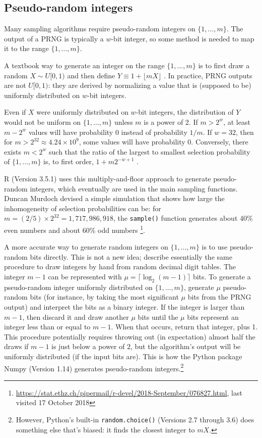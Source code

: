 \documentclass[graybox]{svmult}
\begin{document}
\subsection{Pseudo-random integers}
\label{sec:integers}
Many sampling algorithms require pseudo-random integers on $\{1, \ldots, m\}$.
The output of a PRNG is typically a $w$-bit integer, so some method is needed to map it to the range $\{1, \ldots, m\}$.

A textbook way to generate an integer on the range $\{1, \ldots, m\}$ is to first draw a random $X \sim U[0,1)$
and then define $Y \equiv 1 + \lfloor mX \rfloor$ \cite{press_numerical_1988, peck_introduction_2011}. 
In practice, PRNG outputs are not $U[0,1)$: they are derived by normalizing a value that is
 (supposed to be) uniformly distributed on $w$-bit integers. 

Even if $X$ were uniformly distributed on $w$-bit integers, the distribution of $Y$ would not be uniform on $\{1, \ldots, m\}$ unless $m$ is a power of 2.
If $m > 2^w$, at least $m-2^w$ values will have probability 0 instead of probability $1/m$.
If $w=32$, then for $m>2^{32}\approx4.24 \times 10^9$, some values will have probability 0. 
Conversely, there exists $m < 2^w$ such that the ratio of the largest to smallest selection probability
of $\{1, \ldots, m\}$ is, to first order,  $1+ m 2^{-w+1}$ \cite{knuth_art_1997}.

R (Version 3.5.1) \cite{R_2018} uses this multiply-and-floor approach to generate 
pseudo-random integers,
which eventually are used in the main sampling functions.
Duncan Murdoch devised a simple simulation that shows how large the inhomogeneity of selection
probabilities can be:
for $m=  (2/5) \times 2^{32} = 1,717,986,918$, the \texttt{sample()} function generates about 40\% even numbers and about 60\% odd numbers \footnote{ %
\url{https://stat.ethz.ch/pipermail/r-devel/2018-September/076827.html}, last visited 17 October 2018
}. %
    
A more accurate way to generate random integers on $\{1, \dots, m\}$ is to use pseudo-random bits directly. 
This is not a new idea; \cite{hodges_basic_1970} describe essentially the same procedure to draw integers by hand
from random decimal digit tables.
The integer $m-1$ can be represented with $\mu = \lceil \log_2(m-1) \rceil$ bits. 
To generate a pseudo-random integer uniformly distributed on $\{1, \ldots, m\}$, 
generate $\mu$ pseudo-random bits (for instance, by taking the most significant $\mu$ bits from the PRNG output) and interpret the bits as a binary integer.  
If the integer is larger than $m-1$, then discard it and draw another $\mu$ bits until the $\mu$ bits represent an integer less than or equal to $m-1$.
When that occurs, return that integer, plus 1.
This procedure potentially requires throwing out (in expectation) almost half the draws if $m-1$ is 
just below a power of $2$, but the algorithm's output will be uniformly distributed (if the input bits are).
This is how the Python package Numpy (Version 1.14) generates pseudo-random integers.\footnote{
However, Python's built-in \texttt{random.choice()} (Versions 2.7 through 3.6) does something else that's biased: it finds the closest integer to $mX$.
}
\end{document}
